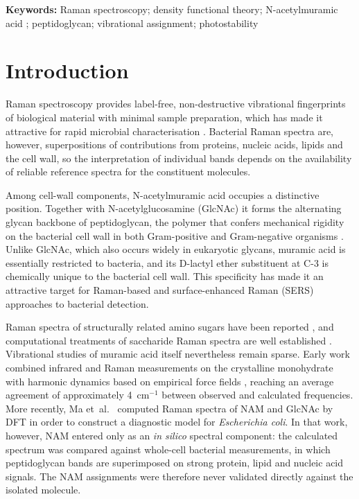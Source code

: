 \documentclass[11pt,a4paper]{article}
\newcommand{\wn}{\ensuremath{\mathrm{cm}^{-1}}}
\begin{document}
\vspace{1em}\noindent\textbf{Keywords:} 
Raman spectroscopy; density functional theory; N-acetylmuramic acid ;
peptidoglycan; vibrational assignment; photostability
\vspace{1em}




\section{Introduction}

Raman spectroscopy provides label-free, non-destructive vibrational fingerprints
of biological material with minimal sample preparation, which has made it
attractive for rapid microbial characterisation \cite{wang2022bacteria,
ma2024ecoli}. Bacterial Raman spectra are, however, superpositions of
contributions from proteins, nucleic acids, lipids and the cell wall, so the
interpretation of individual bands depends on the availability of reliable
reference spectra for the constituent molecules.

Among cell-wall components, N-acetylmuramic acid occupies a distinctive
position. Together with N-acetylglucosamine (GlcNAc) it forms the alternating
glycan backbone of peptidoglycan, the polymer that confers mechanical rigidity
on the bacterial cell wall in both Gram-positive and Gram-negative organisms
\cite{vollmer2008}. Unlike GlcNAc, which also occurs widely in eukaryotic
glycans, muramic acid is essentially restricted to bacteria, and its D-lactyl
ether substituent at C-3 is chemically unique to the bacterial cell wall. This
specificity has made it an attractive target for Raman-based and
surface-enhanced Raman (SERS) approaches to bacterial detection.

Raman spectra of structurally related amino sugars have been reported
\cite{she1974raman}, and computational treatments of saccharide Raman spectra
are well established \cite{kaminsky2020saccharides}. Vibrational studies of
muramic acid itself nevertheless remain sparse. Early work combined infrared and
Raman measurements on the crystalline monohydrate with harmonic dynamics based on
empirical force fields \cite{kouach1994}, reaching an average agreement of
approximately 4~\wn{} between observed and calculated frequencies. More
recently, Ma et~al.\ \cite{ma2024ecoli} computed Raman spectra of NAM and GlcNAc
by DFT in order to construct a diagnostic model for \emph{Escherichia coli}. In
that work, however, NAM entered only as an \emph{in silico} spectral component:
the calculated spectrum was compared against whole-cell bacterial measurements,
in which peptidoglycan bands are superimposed on strong protein, lipid and
nucleic acid signals. The NAM assignments were therefore never validated
directly against the isolated molecule.
\end{document}
